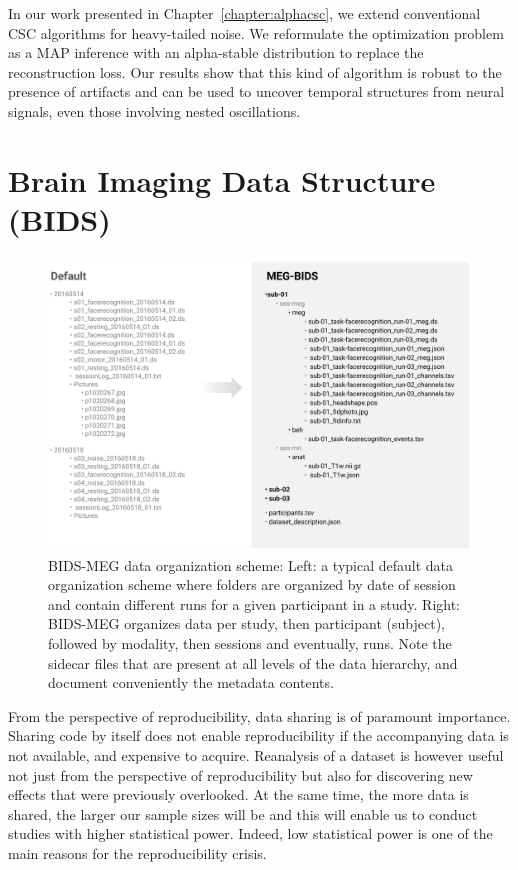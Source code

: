In our work presented in Chapter~\ref{chapter:alphacsc}, we extend conventional \ac{CSC} algorithms for heavy-tailed noise. We reformulate the optimization problem as a \ac{MAP} inference with an alpha-stable distribution to replace the reconstruction loss. Our results show that this kind of algorithm is robust to the presence of artifacts and can be used to uncover temporal structures from neural signals, even those involving nested oscillations.

\clearpage
\section*{Brain Imaging Data Structure (BIDS)}

\begin{figure}[htb!]
\begin{center}
   \includegraphics[width=\linewidth]{figures/bids_organization.png}
\end{center}
   \caption[BIDS-MEG data organization scheme.]{BIDS-MEG data organization scheme: Left: a typical default data organization scheme where folders are organized by date of session and contain different runs for a given participant in a study. Right: BIDS-MEG organizes data per study, then participant (subject), followed by modality, then sessions and eventually, runs. Note the sidecar files that are present at all levels of the data hierarchy, and document conveniently the metadata contents.}
   \label{fig:sommaire:BIDS-MEG-organization}
\end{figure}
From the perspective of reproducibility, data sharing is of paramount importance. Sharing code by itself does not enable reproducibility if the accompanying data is not available, and expensive to acquire. Reanalysis of a dataset is however useful not just from the perspective of reproducibility but also for discovering new effects that were previously overlooked. At the same time, the more data is shared, the larger our sample sizes will be and this will enable us to conduct studies with higher statistical power. Indeed, low statistical power is one of the main reasons for the reproducibility crisis.

